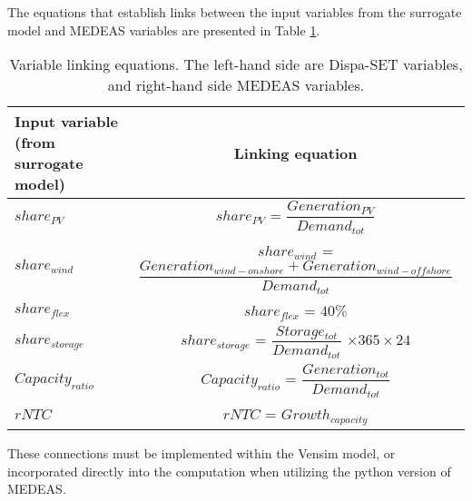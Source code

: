 The equations that establish links between the input variables from the surrogate model and MEDEAS variables are presented in Table \ref{tab:linking-equations}.

\begin{table}[h]
    \centering
    \begin{tabular}{|m{3.6cm}|c|}
    \hline 
    Input variable (from surrogate model) & Linking equation \\ \hline
    {\color{blue} $share_{PV}$} & {\color{blue} $share_{PV}$ = \color{red} $\dfrac{Generation_{PV}}{Demand_{tot}}$ } \\ \hline 
    {\color{blue} $share_{wind}$} & {\color{blue} $share_{wind}$ = \color{red} $\dfrac{Generation_{wind-onshore} + Generation_{wind-offshore}}{Demand_{tot}}$} \\ \hline 
    {\color{blue} $share_{flex}$} & {\color{blue} $share_{flex}$} = $40\%$ \\ \hline 
    {\color{blue} $share_{storage}$} & {\color{blue} $share_{storage}$ = \color{red} $\dfrac{Storage_{tot}}{Demand_{tot}}$} $\times 365\times 24$ \\ \hline 
    {\color{blue} $Capacity_{ratio}$} & {\color{blue} $Capacity_{ratio}$ = \color{red} $\dfrac{Generation_{tot}}{Demand_{tot}}$} \\ \hline 
    {\color{blue} $rNTC$} & {\color{blue} $rNTC$ = \color{red} $Growth_{capacity}$} \\ \hline 
    \end{tabular}
    \caption{Variable linking equations. The left-hand side are Dispa-SET variables, and right-hand side MEDEAS variables.}
    \label{tab:linking-equations}
\end{table}

These connections must be implemented within the Vensim model, or incorporated directly into the computation when utilizing the python version of MEDEAS.